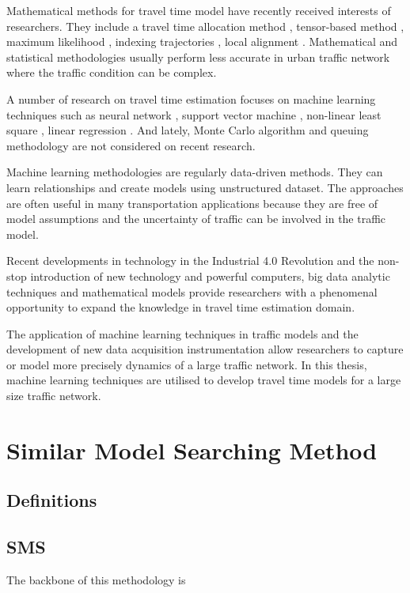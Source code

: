 \documentclass[journal]{IEEEtran}
\begin{document}
Mathematical methods for travel time model have recently received interests of researchers. They include a travel time allocation method \cite{Meng2017}, tensor-based method \cite{Tang2018}, maximum likelihood \cite{Zhao2016}, indexing trajectories \cite{Tomaras2015}, local alignment \cite{Chitraranjan2015}. Mathematical and statistical methodologies usually perform less accurate in urban traffic network where the traffic condition can be complex.

A number of research on travel time estimation focuses on machine learning techniques such as neural network \cite{Lu2018}, support vector machine \cite{Leodolter2015}, non-linear least square \cite{Zhan2013}, linear regression \cite{Leodolter2015}. And lately, Monte Carlo algorithm \cite{Hadachi2013,Hadachi2012} and queuing methodology \cite{Li2013} are not considered on recent research.

Machine learning methodologies are regularly data-driven methods. They can learn relationships and create models using unstructured dataset. The approaches are often useful in many transportation applications because they are free of model assumptions and the uncertainty of traffic can be involved in the traffic model.

Recent developments in technology in the Industrial 4.0 Revolution and the non-stop introduction of new technology and powerful computers, big data analytic techniques and mathematical models provide researchers with a phenomenal opportunity to expand the knowledge in travel time estimation domain. 

The application of machine learning techniques in traffic models and the development of new data acquisition  instrumentation allow researchers to capture or model more precisely dynamics of a large traffic network. In this thesis, machine learning techniques are utilised to develop travel time models for a large size traffic network.


\section{Similar Model Searching Method} 
\label{sec:sms}
\subsection{Definitions}
\subsection{SMS}
The backbone of this methodology is 
\end{document}
